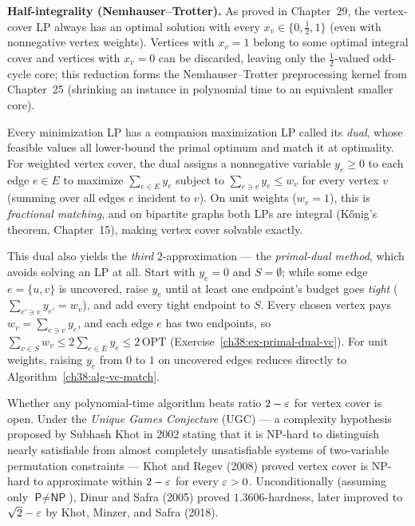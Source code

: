 \begin{focusbox}
\textbf{Half-integrality (Nemhauser--Trotter).} As proved in Chapter~29, the vertex-cover LP always has
an optimal solution with every $x_v\in\{0,\tfrac12,1\}$ (even with nonnegative vertex weights). Vertices
with $x_v=1$ belong to some optimal integral cover and vertices with $x_v=0$ can be discarded, leaving
only the $\tfrac12$-valued odd-cycle core; this reduction forms the Nemhauser--Trotter preprocessing
kernel from Chapter~25 (shrinking an instance in polynomial time to an equivalent smaller core).
\end{focusbox}

\begin{connectionbox}
Every minimization LP has a companion maximization LP called its \emph{dual}, whose feasible values
all lower-bound the primal optimum and match it at optimality. For weighted vertex cover, the dual
assigns a nonnegative variable $y_e\ge 0$ to each edge $e\in E$ to maximize $\sum_{e\in E} y_e$ subject to
$\sum_{e\ni v} y_e\le w_v$ for every vertex $v$ (summing over all edges $e$ incident to $v$). On unit
weights ($w_v=1$), this is \emph{fractional matching}, and on bipartite graphs both LPs are integral
(K\H{o}nig's theorem, Chapter~15), making vertex cover solvable exactly.

This dual also yields the \emph{third} $2$-approximation --- the \emph{primal-dual method}, which avoids
solving an LP at all. Start with $y_e=0$ and $S=\emptyset$; while some edge $e=\{u,v\}$ is uncovered,
raise $y_e$ until at least one endpoint's budget goes \emph{tight} ($\sum_{e'\ni v} y_{e'} = w_v$), and
add every tight endpoint to $S$. Every chosen vertex pays $w_v = \sum_{e\ni v} y_e$, and each edge $e$ has
two endpoints, so $\sum_{v\in S} w_v \le 2\sum_{e\in E} y_e \le 2\,\mathrm{OPT}$ (Exercise~\ref{ch38:ex-primal-dual-vc}).
For unit weights, raising $y_e$ from $0$ to $1$ on uncovered edges reduces directly to Algorithm~\ref{ch38:alg-vc-match}.
\end{connectionbox}

\begin{marginnotebox}
Whether any polynomial-time algorithm beats ratio $2-\varepsilon$ for vertex cover is open. Under the
\emph{Unique Games Conjecture} (UGC) --- a complexity hypothesis proposed by Subhash Khot in 2002 stating
that it is \textsf{NP}-hard to distinguish nearly satisfiable from almost completely unsatisfiable
systems of two-variable permutation constraints --- Khot and Regev (2008) proved vertex cover is
\textsf{NP}-hard to approximate within $2-\varepsilon$ for every $\varepsilon>0$. Unconditionally (assuming only
$\textsf{P}\neq\textsf{NP}$), Dinur and Safra (2005) proved $1.3606$-hardness, later improved to
$\sqrt{2}-\varepsilon$ by Khot, Minzer, and Safra (2018).
\end{marginnotebox}

